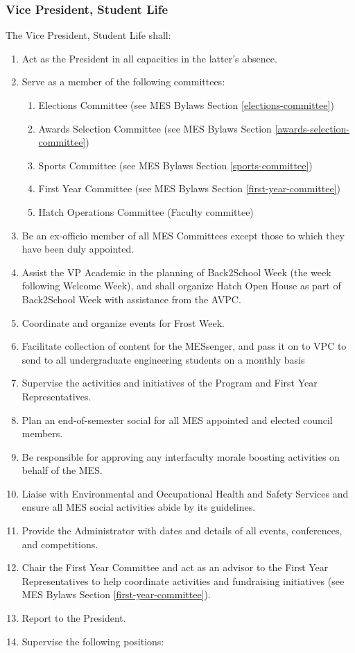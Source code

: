 \subsubsection{Vice President, Student
  Life}
\label{vice-president-student-life}
The Vice President, Student Life shall:

\begin{enumerate}
 \item
  Act as the President in all capacities in the latter's absence.
 \item
  Serve as a member of the following committees:

  \begin{enumerate}
   \item
    Elections Committee (see MES Bylaws Section \ref{elections-committee})
   \item
    Awards Selection Committee (see MES Bylaws Section \ref{awards-selection-committee})
   \item
    Sports Committee (see MES Bylaws Section \ref{sports-committee})
   \item
    First Year Committee (see MES Bylaws Section \ref{first-year-committee})
   \item
    Hatch Operations Committee (Faculty committee)
  \end{enumerate}
 \item
  Be an ex-officio member of all MES Committees except those to which
  they have been duly appointed.
 \item
  Assist the VP Academic in the planning of Back2School Week (the week
  following Welcome Week), and shall organize Hatch Open House as part
  of Back2School Week with assistance from the AVPC.
 \item
  Coordinate and organize events for Frost Week.
 \item
  Facilitate collection of content for the MESsenger, and pass it on to
  VPC to send to all undergraduate engineering students on a monthly
  basis
 \item
  Supervise the activities and initiatives of the Program and First Year
  Representatives.
 \item
  Plan an end-of-semester social for all MES appointed and elected
  council members.
 \item
  Be responsible for approving any interfaculty morale boosting
  activities on behalf of the MES.
 \item
  Liaise with Environmental and Occupational Health and Safety Services
  and ensure all MES social activities abide by its guidelines.
 \item
  Provide the Administrator with dates and details of all events,
  conferences, and competitions.
 \item
  Chair the First Year Committee and act as an advisor to the First Year
  Representatives to help coordinate activities and fundraising
  initiatives (see MES Bylaws Section \ref{first-year-committee}).
 \item
  Report to the President.
 \item
  Supervise the following positions:


\end{enumerate}
